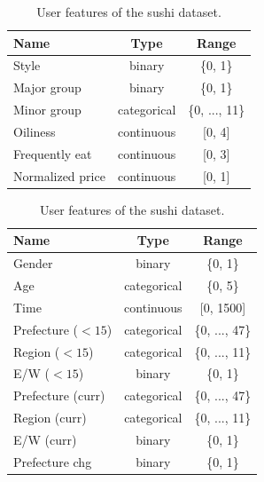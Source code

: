 \documentclass{article}
\begin{document}
\begin{table}
    \centering
    
    \begin{minipage}[t]{0.48\textwidth}
        \centering
        \caption{Item features of the sushi dataset.}
        \label{tab:sushi_items}
        \begin{tabular}{lcc}
            \toprule
            Name             & Type        & Range          \\
            \midrule
            Style            & binary      & \{0, 1\}       \\
            Major group      & binary      & \{0, 1\}       \\
            Minor group      & categorical & \{0, ..., 11\} \\
            Oiliness         & continuous  & [0, 4]         \\
            Frequently eat   & continuous  & [0, 3]         \\
            Normalized price & continuous  & [0, 1]         \\
            \bottomrule
        \end{tabular}
    \end{minipage}
    \hfill %
    \begin{minipage}[t]{0.48\textwidth}
        \centering
        \caption{User features of the sushi dataset.}
        \label{tab:sushi_users}
        \begin{tabular}{lcc}
            \toprule
            Name & Type & Range \\
            \midrule
            Gender & binary & \{0, 1\} \\
            Age & categorical & \{0, 5\} \\
            Time & continuous & [0, 1500] \\
            Prefecture ($<15$) & categorical & \{0, ..., 47\} \\
            Region ($<15$) & categorical & \{0, ..., 11\} \\
            E/W ($<15$) & binary & \{0, 1\} \\
            Prefecture (curr) & categorical & \{0, ..., 47\} \\
            Region (curr) & categorical & \{0, ..., 11\} \\
            E/W (curr) & binary & \{0, 1\} \\
            Prefecture chg & binary & \{0, 1\} \\
            \bottomrule
        \end{tabular}
    \end{minipage}
\end{table}
\end{document}
